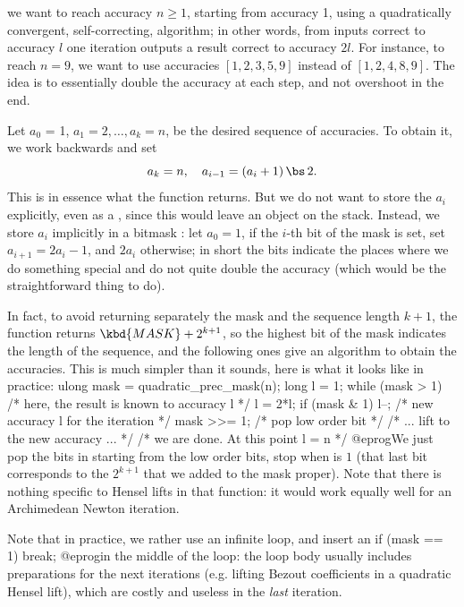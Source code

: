  we want to reach accuracy
$n\geq 1$, starting from accuracy 1, using a quadratically convergent,
self-correcting, algorithm; in other words, from inputs correct to accuracy
$l$ one iteration outputs a result correct to accuracy $2l$.
For instance, to reach $n = 9$, we want to use accuracies
$[1,2,3,5,9]$ instead of $[1,2,4,8,9]$. The idea is to essentially double
the accuracy at each step, and not overshoot in the end.

Let $a_0$ = 1, $a_1 = 2, \ldots, a_k = n$, be the desired sequence of
accuracies. To obtain it, we work backwards and set
$$ a_k = n,\quad a_{i-1} = (a_i + 1)\,\bs\, 2.$$
This is in essence what the function returns.
But we do not want to store the $a_i$ explicitly, even as a ,
since this would leave an object on the stack. Instead, we store $a_i$
implicitly in a bitmask : let $a_0 = 1$, if the $i$-th bit of the
mask is set, set $a_{i+1} = 2a_i - 1$, and $2a_i$ otherwise; in short the
bits indicate the places where we do something special and do not quite
double the accuracy (which would be the straightforward thing to do).

In fact, to avoid returning separately the mask and the sequence length
$k+1$, the function returns $\kbd{MASK} + 2^{k+1}$, so the highest bit of
the mask indicates the length of the sequence, and the following ones give
an algorithm to obtain the accuracies. This is much simpler than it sounds,
here is what it looks like in practice:
\bprog
  ulong mask = quadratic_prec_mask(n);
  long l = 1;
  while (mask > 1) {            /* here, the result is known to accuracy l */
    l = 2*l; if (mask & 1) l--; /* new accuracy l for the iteration */
    mask >>= 1;                 /* pop low order bit */
    /* ... lift to the new accuracy ... */
  }
  /* we are done. At this point l = n */
@eprog\noindent We just pop the bits in  starting from the low
order bits, stop when  is $1$ (that last bit corresponds to the
$2^{k+1}$ that we added to the mask proper). Note that there is nothing
specific to Hensel lifts in that function: it would work equally well for
an Archimedean Newton iteration.

Note that in practice, we rather use an infinite loop, and insert an
\bprog
  if (mask == 1) break;
@eprog\noindent in the middle of the loop: the loop body usually includes
preparations for the next iterations (e.g. lifting Bezout coefficients
in a quadratic Hensel lift), which are costly and useless in the \emph{last}
iteration.

